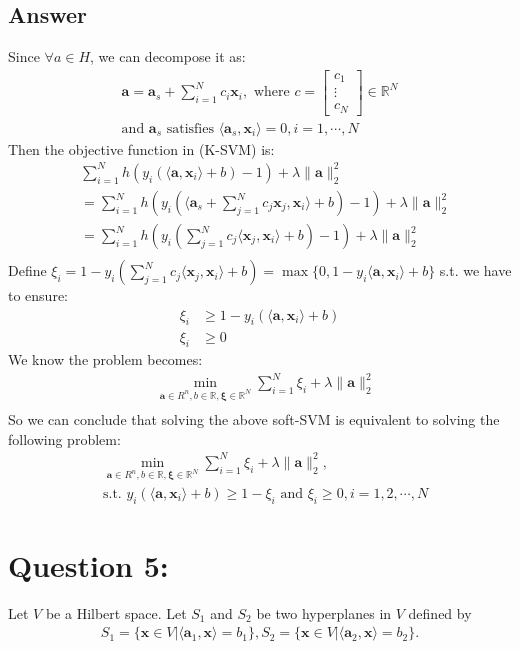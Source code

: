 \documentclass[a4paper,12pt]{article}
\newcommand{\R}{\mathbb{R}}
\begin{document}
\subsection*{Answer}
Since \(\forall a \in H\), we can decompose it as:
\begin{align*}
    \bm{a} = \bm{a}_s + \sum_{i=1}^{N}c_i\bm{x}_i, \text{ where } c = \begin{bmatrix}
        c_1 \\
        \vdots \\
        c_N
    \end{bmatrix} \in \R^N \\
    \text{and } \bm{a}_s \text{ satisfies } \langle \bm{a}_s, \bm{x}_i\rangle = 0, i=1, \cdots, N
\end{align*}
Then the objective function in (K-SVM) is:
\begin{align*}
    &\sum_{i=1}^N h(y_i (\langle \bm{a}, \bm{x}_i\rangle + b) - 1) + \lambda\|\bm{a}\|_2^2 \\
    &= \sum_{i=1}^N h(y_i (\langle \bm{a}_s + \sum_{j=1}^N c_j \bm{x}_j, \bm{x}_i\rangle + b) - 1) + \lambda\|\bm{a}\|_2^2 \\
    &= \sum_{i=1}^N h(y_i (\sum_{j=1}^N c_j \langle \bm{x}_j, \bm{x}_i\rangle + b) - 1) +  \lambda\|\bm{a}\|_2^2 \\
\end{align*}
Define \(\xi_i = 1 - y_i (\sum_{j=1}^N c_j \langle \bm{x}_j, \bm{x}_i\rangle + b) = \max\{0, 1 - y_i\langle \bm{a}, \bm{x}_i\rangle + b\}\)
s.t. we have to ensure:
\begin{align*}
    \xi_i &\geq 1 - y_i(\langle \bm{a}, \bm{x}_i \rangle + b) \\
    \xi_i &\geq 0
\end{align*}
We know the problem becomes:
\begin{align*}
    &\min_{\bm{a} \in R^n, b \in \R, \bm{\xi} \in \R^N} \sum_{i = 1}^N \xi_i + \lambda\|\bm{a}\|_2^2 \\
\end{align*}
So we can conclude that solving the above soft-SVM is equivalent to solving the following problem:
\begin{align*}
    &\min_{\bm{a} \in R^n, b \in \R, \bm{\xi} \in \R^N} \sum_{i = 1}^N \xi_i + \lambda\|\bm{a}\|_2^2, \\
    &\text{s.t. } y_i(\langle \bm{a}, \bm{x}_i\rangle + b) \geq 1 - \xi_i \text{ and } \xi_i \geq 0, i = 1,2,\cdots,N
\end{align*}


\section*{Question 5:}
Let \(V\) be a Hilbert space. Let \(S_1\) and \(S_2\) be two hyperplanes in \(V\) defined by
\begin{align*}
    S_1 = \{\bm{x} \in V | \langle \bm{a}_1, \bm{x}\rangle = b_1\}, S_2 = \{\bm{x} \in V | \langle \bm{a}_2, \bm{x} \rangle = b_2\}.
\end{align*}
\end{document}
